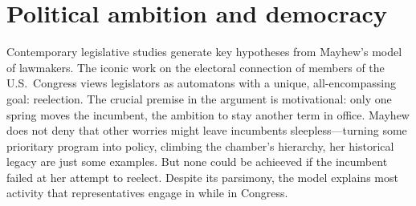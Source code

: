 \documentclass[letter,12pt]{article}
\begin{document}



\section{Political ambition and democracy}

\noindent Contemporary legislative studies generate key hypotheses from Mayhew's \citeyearpar{mayhew.1974} model of lawmakers. The iconic work on the electoral connection of members of the U.S.\ Congress views legislators as automatons with a unique, all-encompassing goal: reelection. The crucial premise in the argument is motivational: only one spring moves the incumbent, the ambition to stay another term in office. Mayhew does not deny that other worries might leave incumbents sleepless---turning some prioritary program into policy, climbing the chamber's hierarchy, her historical legacy are just some examples. But none could be achieeved if the incumbent failed at her attempt to reelect. Despite its parsimony, the model explains most activity that representatives engage in while in Congress. 
\end{document}
